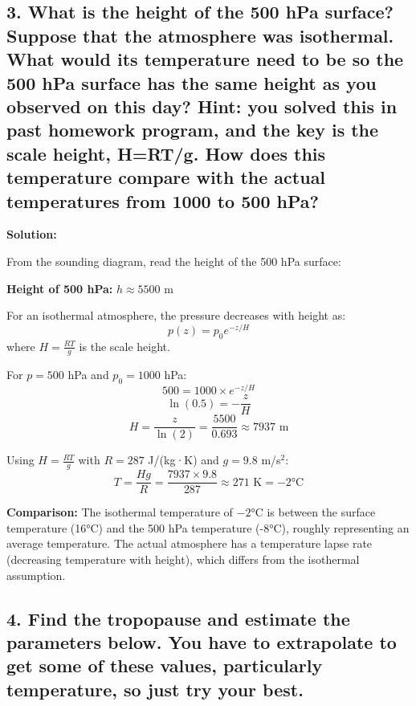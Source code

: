 \documentclass[letterpaper, 11pt]{article}
\newcommand{\1}{\mathds{1}}	%
\theoremstyle{definition}
\begin{document}
\subsection*{3. What is the height of the 500 hPa surface? Suppose that the atmosphere was isothermal. What would its temperature need to be so the 500 hPa surface has the same height as you observed on this day? Hint: you solved this in past homework program, and the key is the scale height, H=RT/g. How does this temperature compare with the actual temperatures from 1000 to 500 hPa?}

\textbf{Solution:} 

From the sounding diagram, read the height of the 500 hPa surface:

\textbf{Height of 500 hPa:} $h \approx 5500$ m

For an isothermal atmosphere, the pressure decreases with height as:
\begin{equation}
p(z) = p_0 e^{-z/H}
\end{equation}
where $H = \frac{RT}{g}$ is the scale height.

For $p = 500$ hPa and $p_0 = 1000$ hPa:
\begin{equation}
500 = 1000 \times e^{-z/H}
\end{equation}
\begin{equation}
\ln(0.5) = -\frac{z}{H}
\end{equation}
\begin{equation}
H = \frac{z}{\ln(2)} = \frac{5500}{0.693} \approx 7937 \text{ m}
\end{equation}

Using $H = \frac{RT}{g}$ with $R = 287$ J/(kg·K) and $g = 9.8$ m/s$^2$:
\begin{equation}
T = \frac{Hg}{R} = \frac{7937 \times 9.8}{287} \approx 271 \text{ K} = -2°\text{C}
\end{equation}

\textbf{Comparison:} The isothermal temperature of $-2°\text{C}$ is between the surface temperature (16°C) and the 500 hPa temperature (-8°C), roughly representing an average temperature. The actual atmosphere has a temperature lapse rate (decreasing temperature with height), which differs from the isothermal assumption.

\subsection*{4. Find the tropopause and estimate the parameters below. You have to extrapolate to get some of these values, particularly temperature, so just try your best.}
\end{document}

